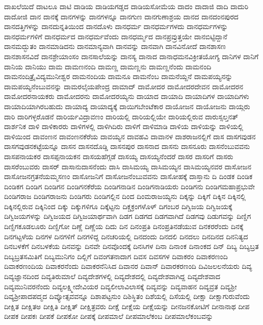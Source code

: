{ದಾಖಲೆಯಿದೆ
ದಾಟಲೂ
ದಾಟಿ
ದಾಡಿಯ
ದಾಡಿಯಗಡ್ಡದ
ದಾಡಿಯಸೋಮೆಯ
ದಾದಂ
ದಾದಾಜಿ
ದಾದಿ
ದಾದುರಿ
ದಾದೋಜಿ
ದಾನ
ದಾನಕ್ಕೆ
ದಾನಗಳನ್ನು
ದಾನಗಳನ್ನೂ
ದಾನಗುಣ
ದಾನಗುಣಾಶ್ರಯ
ದಾನದ
ದಾನದಂನಪುರದ
ದಾನದತ್ತಿಗಳನ್ನು
ದಾನದುನ್ನತಿಯಿಂದ
ದಾನದೊಳು
ದಾನಧರ್ಮ
ದಾನಧರ್ಮಗಳದು
ದಾನಧರ್ಮಗಳನ್ನು
ದಾನಧರ್ಮಗಳಿಗೆ
ದಾನಧರ್ಮದ
ದಾನಧರ್ಮವೆಂದು
ದಾನಧರ್ಮ್ಮದ
ದಾನಪ್ರವ್ರುತ್ತಯೇ
ದಾನಬಿಟ್ಟಿದ್ದಾನೆ
ದಾನಮದ್ಭುತಂ
ದಾನಮಾಡಿದನು
ದಾನಮಾನ್ಯವಾಗಿ
ದಾನವನ್ನು
ದಾನವಾಗಿ
ದಾನವಿನೋದೆ
ದಾನಶಾಸಣ
ದಾನಶಾಸನವಿದೆ
ದಾನಶ್ರೇಯಾಂಸಂ
ದಾನಸಾಲೆಯನ್ನು
ದಾನಸ್ಯ
ದಾನಾದ
ದಾನಾಧಮನವಿಕ್ರೀತಯೋಗ್ಯ
ದಾನಿಗಳ
ದಾನಿಗೆ
ದಾನಿಯ
ದಾನಿಯು
ದಾಮ
ದಾಮಣನಂದಿ
ದಾಮಣ್ಣ
ದಾಮಣ್ಣನು
ದಾಮಣ್ಣನೆಂದು
ದಾಮನಂದಿ
ದಾಮನಂದಿತ್ರೈವಿದ್ಯಮುನೀಶ್ವರ
ದಾಮನಂದಿಯ
ದಾಮನೂ
ದಾಮನೆಂಬ
ದಾಮನೆಯ್ದನೆ
ದಾಮಪಯ್ಯನನ್ನು
ದಾಮಪಯ್ಯನೆಂಬುವನನ್ನು
ದಾಮರಲೈಯಪೇಂದ್ರ
ದಾಮಾದ್
ದಾಮೋದರ
ದಾಮೋದರದೇವನ
ದಾಮೋದರನ
ದಾಮೋದರನಾಯಕರು
ದಾಮೋದರನು
ದಾಮೋದರಯ್ಯನು
ದಾಯಾದ
ದಾಯಾದಿ
ದಾಯಾದಿಗಳ
ದಾಯಾದಿಗಳು
ದಾಯಾದಿಯಾಗಿರಬಹುದು
ದಾಯಾದ್ಯ
ದಾಯಾದ್ಯಕ್ಕೆ
ದಾಯಿಗಬೇಂಟೆಕಾರ
ದಾಯೋಜನ
ದಾಯೋಜನು
ದಾಯ್ಗರು
ದಾರಿ
ದಾರಿಗಳ್ಳರೊಡನೆ
ದಾರಿರ್ಯವಿದ್ರಾವಣಂ
ದಾರಿಯಲ್ಲಿ
ದಾರಿಯಲ್ಲಿಯೇ
ದಾರಿಯಲ್ಲಿರುವ
ದಾರುಸ್ಸಲ್ತನತ್
ದಾರ್ಶನಿಕ
ದಾಳಿ
ದಾಳಿಕಾರರು
ದಾಳಿಗಳಲ್ಲಿ
ದಾಳಿಗಿದಿರು
ದಾಳಿಗೆ
ದಾಳಿಮಾಡಿ
ದಾಳಿಯ
ದಾಳಿಯನ್ನು
ದಾಳಿಯಲ್ಲಿ
ದಾಳಿಯಿಂದ
ದಾವಂಣನ
ದಾವಂಣನಕೆರೆಯ
ದಾವಯ್ಯನ
ದಾವಹವಿ
ದಾವಾನಳ
ದಾಶರಾಜನಲ್ಲಿಗೆ
ದಾಸ
ದಾಸಗವುಡನ
ದಾಸಗವುಡನಕಟ್ಟೆಯನ್ನೂ
ದಾಸನ
ದಾಸನದೊಡ್ಡಿ
ದಾಸನಪುರ
ದಾಸನಾದ
ದಾಸನು
ದಾಸನೂರು
ದಾಸನೆಂಬುವವನು
ದಾಸಪನಾಯಕರ
ದಾಸಪ್ಪನಾಯಕನ
ದಾಸಯಹೆಗ್ಗಡೆ
ದಾಸಯ್ಯ
ದಾಸಯ್ಯನೆಂದರೆ
ದಾಸರ
ದಾಸರಿಗೆ
ದಾಸರು
ದಾಸರೆಂಬುವರು
ದಾಸರ್
ದಾಸಾನುದಾಸನೆಂದು
ದಾಸಿ
ದಾಸಿಮಯ್ಯ
ದಾಸಿಮಯ್ಯನ
ದಾಸಿಮಯ್ಯನವರ
ದಾಸೋಜನ
ದಾಸೋಜನಗ್ರತನೆಯಮ್ಮಸಣಂ
ದಾಸೋಜನಿಗೆ
ದಾಸೋಜನೆಂಬುವವನು
ದಾಸೋಹಕ್ಕೆ
ದಾಸ್ತಾನು
ದಿ
ದಿಂಡಕ
ದಿಂಡಿಕ
ದಿಂಡಿಕಗ
ದಿಂಡಿಗ
ದಿಂಡಿಗನ
ದಿಂಡಿಗನಕೆರೆಯ
ದಿಂಡಿಗನಾಡಿನ
ದಿಂಡಿಗನಾಡಿಯರು
ದಿಂಡಿಗನು
ದಿಂಡಿಗಮಹಾಪ್ರಭುವೇ
ದಿಂಡಿಗರಾಜ
ದಿಂಡಿಗರಾಜನು
ದಿಂಡಿಗರು
ದಿಂಡಿಗಲ್ಲಿನ
ದಿಂದ
ದಿಂಮರಾಜಯ್ಯನು
ದಿಕ್ಕನ್ನು
ದಿಕ್ಕಿಗೆ
ದಿಕ್ಕಿನ
ದಿಕ್ಕಿನಲ್ಲಿ
ದಿಕ್ಕಿನಲ್ಲಿರುವ
ದಿಕ್ಕಿನಿಂದ
ದಿಕ್ಕು
ದಿಕ್ಕುಗಳಿಗೂ
ದಿಕ್ಕೆಟ್ಟನು
ದಿಕ್ಚಕ್ರಂಗಳೊಳ್
ದಿಗಂಬರ
ದಿಗ್ವಿಜಯ
ದಿಗ್ವಿಜಯಕ್ಕೆ
ದಿಗ್ವಿಜಯಗಳನ್ನು
ದಿಗ್ವಿಜಯದ
ದಿಗ್ವಿಜಯಾರ್ಥವಾಗಿ
ದಿಡಗ
ದಿಡಗದ
ದಿಡಗವಾಗಿದೆ
ದಿಡಗವು
ದಿಡುಗವನ್ನು
ದಿಣ್ಡಿಗ
ದಿಣ್ಡಿಗಕೂಡಲೂರು
ದಿಣ್ಡಿಗೋ
ದಿಣ್ಣೆ
ದಿಣ್ಣೆಯ
ದಿದು
ದಿನ
ದಿನಂಪ್ರತಿ
ದಿನಂಪ್ರತಿನಡೆಯುವ
ದಿನಕರರೆಂದು
ದಿನಕ್ಕೆ
ದಿನಗಟ್ಟಳೆಯ
ದಿನಗಳ
ದಿನಗಳಿಗೆ
ದಿನಗಳಿದ್ದ
ದಿನಚರಿಯಲ್ಲಿ
ದಿನದಂದು
ದಿನದಲಿ
ದಿನದಲು
ದಿನದಿನದ
ದಿನನಿತ್ಯದ
ದಿನಬಳಕೆಗೆ
ದಿನಬಳಕೆಯ
ದಿನವನ್ನು
ದಿನವೇ
ದಿನವೊಂದಕ್ಕೆ
ದಿನಸಿಗಳ
ದಿನಾ
ದಿನಾಂಕ
ದಿನಾಂಕದ
ದಿನ್
ದಿಬ್ಯ
ದಿಬ್ಯಬ್ರತ
ದಿಬ್ಯಬ್ರತಸಮಿತಿಗೆ
ದಿಬ್ಯಮುನಿಗಂ
ದಿಲ್ಲಿಗೆ
ದಿವಂಗತನಾದಾಗ
ದಿವಸ
ದಿವಸಗಳ
ದಿವಾಕರಂ
ದಿವಾಕರಣಂದಿ
ದಿವಾಕರಣಂದಿಯ
ದಿವಾಕರನೆಂದು
ದಿವಾಕರನೆನಿಸಿದ
ದಿವಾನರ
ದಿವಾನ್
ದಿವಾರಕರಣಂದಿ
ದಿವಿಜಲಲನೆಯರು
ದಿವ್ಯ
ದಿವ್ಯಜ್ಞಾನದಿಂದ
ದಿವ್ಯತಿರುಮಾಲೆ
ದಿವ್ಯದೇಶಗಳಲ್ಲಿ
ದಿವ್ಯದೇಶದಲ್ಲಿ
ದಿವ್ಯದೇಶವಾಗಿದ್ದ
ದಿವ್ಯದೇಶವಾದ
ದಿವ್ಯಮುನಿವರನೆಂದು
ದಿವ್ಯಲಕ್ಷ್ಮೀದೇವಿಯರ
ದಿವ್ಯಲೀಲಾವಿಲಾಸಕ್ಕೆ
ದಿವ್ಯವನ್ನು
ದಿವ್ಯವಾಹನ
ದಿವ್ಯವ್ರತ
ದಿವ್ಯಶ್ರೀ
ದಿವ್ಯಶ್ರೀಪಾದಪದ್ಮದ
ದಿವ್ಯೋತ್ಸವವನ್ನೂ
ದಿಶಾಪಟ್ಟನುಂ
ದಿಶಿಸ್ಥಿತಂ
ದಿಶೆಯಲ್ಲಿ
ದಿಸೆಯಲ್ಲಿ
ದೀಕ್ಷಾ
ದೀಕ್ಷಾಗುರುವೆಂದು
ದೀಕ್ಷಿತ
ದೀಕ್ಷಿತಅ
ದೀಕ್ಷಿತಿ
ದೀಕ್ಷಿತ್
ದೀಕ್ಷಿತ್ರವರು
ದೀಕ್ಷೆ
ದೀಕ್ಷೆಯ
ದೀಕ್ಷೆಯನ್ನು
ದೀನಜನಕೋಟಿಗೆ
ದೀನಾನಾಥ
ದೀಪ
ದೀಪಕ
ದೀಪಕಃ
ದೀಪಕೆ
ದೀಪಕೋ
ದೀಪಕ್ಕೆ
ದೀಪಮಾಲೆ
ದೀಪಮಾಲೆಕಂಬ
ದೀಪಮಾಲೆಕಂಬವನ್ನು
}
